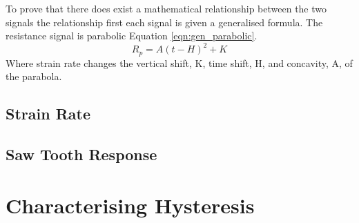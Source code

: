 To prove that there does exist a mathematical relationship between the two signals the relationship first each signal is given a generalised formula. The resistance signal is parabolic Equation \ref{eqn:gen_parabolic}. 
\begin{equation}
	R_p = A(t-H)^2 + K
	\label{eqn:gen_parabolic}
\end{equation}
Where strain rate changes the vertical shift, K, time shift, H, and concavity, A, of the parabola. 

\subsection{Strain Rate}


\subsection{Saw Tooth Response}


\section{Characterising Hysteresis}

